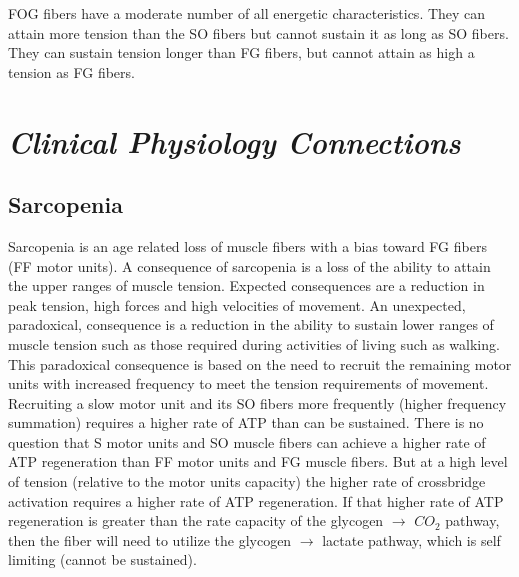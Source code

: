 FOG fibers have a moderate number of all energetic characteristics. They can attain more tension than the SO fibers but cannot sustain it as long as SO fibers. They can sustain tension longer than FG fibers, but cannot attain as high a tension as FG fibers. 

\section{\textit{Clinical Physiology Connections}}

\subsection{Sarcopenia}

Sarcopenia is an age related loss of muscle fibers with a bias toward FG fibers (FF motor units). A consequence of sarcopenia is a loss of the ability to attain the upper ranges of muscle tension. Expected consequences are a reduction in peak tension, high forces and high velocities of movement. An unexpected, paradoxical, consequence is a reduction in the ability to sustain lower ranges of muscle tension such as those required during activities of living such as walking. This paradoxical consequence is based on the need to recruit the remaining motor units with increased frequency to meet the tension requirements of movement. Recruiting a slow motor unit and its SO fibers more frequently (higher frequency summation) requires a higher rate of ATP than can be sustained. There is no question that S motor units and SO muscle fibers can achieve a higher rate of ATP regeneration than FF motor units and FG muscle fibers. But at a high level of tension (relative to the motor units capacity) the higher rate of crossbridge activation requires a higher rate of ATP regeneration. If that higher rate of ATP regeneration is greater than the rate capacity of the glycogen $\rightarrow$ $CO_2$ pathway, then the fiber will need to utilize the glycogen $\rightarrow$ lactate pathway, which is self limiting (cannot be sustained). 

